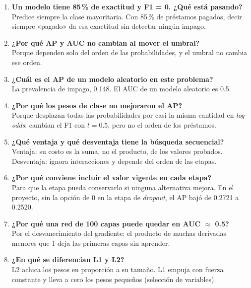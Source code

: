 \documentclass[11pt,a4paper]{article}
\begin{document}
\begin{enumerate}[label=\textbf{\arabic*.}, leftmargin=*]
\item \textbf{Un modelo tiene 85\,\% de exactitud y F1 = 0. ¿Qué está pasando?}\\
Predice siempre la clase mayoritaria. Con 85\,\% de préstamos pagados, decir siempre «pagado» da esa exactitud sin detectar ningún impago.

\item \textbf{¿Por qué AP y AUC no cambian al mover el umbral?}\\
Porque dependen solo del orden de las probabilidades, y el umbral no cambia ese orden.

\item \textbf{¿Cuál es el AP de un modelo aleatorio en este problema?}\\
La prevalencia de impago, 0.148. El AUC de un modelo aleatorio es 0.5.

\item \textbf{¿Por qué los pesos de clase no mejoraron el AP?}\\
Porque desplazan todas las probabilidades por casi la misma cantidad en \textit{log-odds}: cambian el F1 con $t=0.5$, pero no el orden de los préstamos.

\item \textbf{¿Qué ventaja y qué desventaja tiene la búsqueda secuencial?}\\
Ventaja: su costo es la suma, no el producto, de los valores probados. Desventaja: ignora interacciones y depende del orden de las etapas.

\item \textbf{¿Por qué conviene incluir el valor vigente en cada etapa?}\\
Para que la etapa pueda conservarlo si ninguna alternativa mejora. En el proyecto, sin la opción de 0 en la etapa de \textit{dropout}, el AP bajó de 0.2721 a 0.2520.

\item \textbf{¿Por qué una red de 100 capas puede quedar en AUC $\approx$ 0.5?}\\
Por el desvanecimiento del gradiente: el producto de muchas derivadas menores que 1 deja las primeras capas sin aprender.

\item \textbf{¿En qué se diferencian L1 y L2?}\\
L2 achica los pesos en proporción a su tamaño. L1 empuja con fuerza constante y lleva a cero los pesos pequeños (selección de variables).


\end{enumerate}
\end{document}
